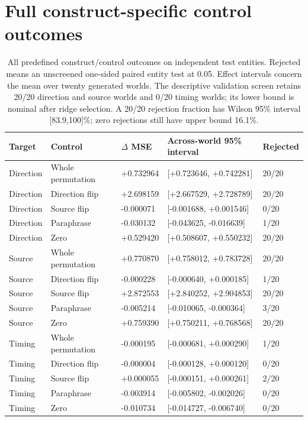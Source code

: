 \section{Full construct-specific control outcomes}

\begin{table}[htbp]
\centering\small
\caption{All predefined construct/control outcomes on independent test entities. Rejected means an unscreened one-sided paired entity test at 0.05. Effect intervals concern the mean over twenty generated worlds. The descriptive validation screen retains 20/20 direction and source worlds and 0/20 timing worlds; its lower bound is nominal after ridge selection. A 20/20 rejection fraction has Wilson 95\% interval [83.9,100]\%; zero rejections still have upper bound 16.1\%.}
\label{tab:construct_full}
\begin{tabular}{lllll}
\toprule
Target & Control & $\Delta$ MSE & Across-world 95\% interval & Rejected\\
\midrule
Direction & Whole permutation & +0.732964 & [+0.723646, +0.742281] & 20/20\\
Direction & Direction flip & +2.698159 & [+2.667529, +2.728789] & 20/20\\
Direction & Source flip & -0.000071 & [-0.001688, +0.001546] & 0/20\\
Direction & Paraphrase & -0.030132 & [-0.043625, -0.016639] & 1/20\\
Direction & Zero & +0.529420 & [+0.508607, +0.550232] & 20/20\\
Source & Whole permutation & +0.770870 & [+0.758012, +0.783728] & 20/20\\
Source & Direction flip & -0.000228 & [-0.000640, +0.000185] & 1/20\\
Source & Source flip & +2.872553 & [+2.840252, +2.904853] & 20/20\\
Source & Paraphrase & -0.005214 & [-0.010065, -0.000364] & 3/20\\
Source & Zero & +0.759390 & [+0.750211, +0.768568] & 20/20\\
Timing & Whole permutation & -0.000195 & [-0.000681, +0.000290] & 1/20\\
Timing & Direction flip & -0.000004 & [-0.000128, +0.000120] & 0/20\\
Timing & Source flip & +0.000055 & [-0.000151, +0.000261] & 2/20\\
Timing & Paraphrase & -0.003914 & [-0.005802, -0.002026] & 0/20\\
Timing & Zero & -0.010734 & [-0.014727, -0.006740] & 0/20\\
\bottomrule
\end{tabular}
\end{table}

